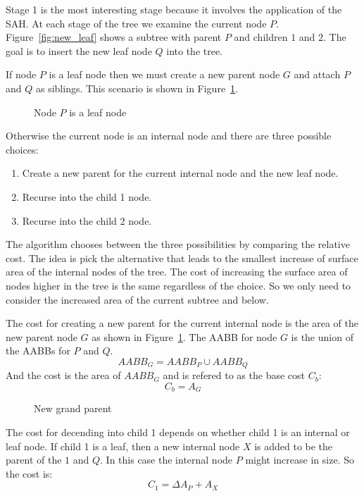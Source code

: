 \documentclass{article}
\begin{document}
Stage 1 is the most interesting stage because it involves the application of the SAH. At each stage of the tree we examine the current node $P$. Figure~\ref{fig:new_leaf} shows a subtree with parent $P$ and children $1$ and $2$. The goal is to insert the new leaf node $Q$ into the tree.

If node $P$ is a leaf node then we must create a new parent node $G$ and attach $P$ and $Q$ as siblings. This scenario is shown in Figure~\ref{fig:single_leaf}.

\begin{figure}
	\begin{center}
		
	\end{center}
	\caption{Node $P$ is a leaf node}
	\label{fig:single_leaf}
\end{figure}

Otherwise the current node is an internal node and there are three possible choices:
\begin{enumerate}
	\item Create a new parent for the current internal node and the new leaf node.
	\item Recurse into the child 1 node.
	\item Recurse into the child 2 node.
\end{enumerate}
The algorithm chooses between the three possibilities by comparing the relative cost. The idea is pick the alternative that leads to the smallest increase of surface area of the internal nodes of the tree. The cost of increasing the surface area of nodes higher in the tree is the same regardless of the choice. So we only need to consider the increased area of the current subtree and below.

The cost for creating a new parent for the current internal node is the area of the new parent node $G$ as shown in Figure~\ref{fig:single_leaf}. The AABB for node $G$ is the union of the AABBs for $P$ and $Q$.
\[AABB_G = AABB_P \cup AABB_Q \]
And the cost is the area of $AABB_G$ and is refered to as the base cost $C_b$:
\[ C_b = A_G \]

\begin{figure}
	\begin{center}
		
	\end{center}
	\caption{New grand parent}
	\label{fig:grand_parent}
\end{figure}

The cost for decending into child 1 depends on whether child 1 is an internal or leaf node. If child 1 is a leaf, then a new internal node $X$ is added to be the parent of the $1$ and $Q$. In this case the internal node $P$ might increase in size. So the cost is:
\[ C_1 = \Delta A_P + A_X \]
\end{document}

